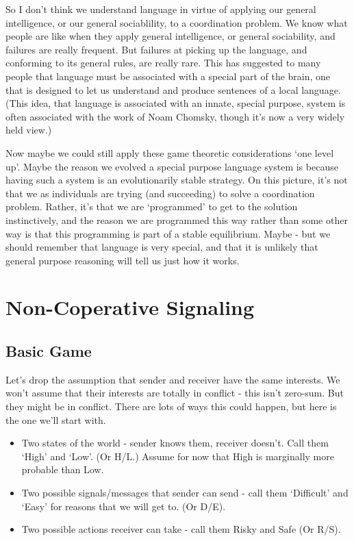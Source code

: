 \documentclass[
  11pt,
]{article}
\providecommand{\tightlist}{%
  \setlength{\itemsep}{0pt}\setlength{\parskip}{0pt}}
\begin{document}
So I don't think we understand language in virtue of applying our
general intelligence, or our general sociablility, to a coordination
problem. We know what people are like when they apply general
intelligence, or general sociability, and failures are really frequent.
But failures at picking up the language, and conforming to its general
rules, are really rare. This has suggested to many people that language
must be associated with a special part of the brain, one that is
designed to let us understand and produce sentences of a local language.
(This idea, that language is associated with an innate, special purpose,
system is often associated with the work of Noam Chomsky, though it's
now a very widely held view.)

Now maybe we could still apply these game theoretic considerations `one
level up'. Maybe the reason we evolved a special purpose language system
is because having such a system is an evolutionarily stable strategy. On
this picture, it's not that we as individuals are trying (and
succeeding) to solve a coordination problem. Rather, it's that we are
`programmed' to get to the solution instinctively, and the reason we are
programmed this way rather than some other way is that this programming
is part of a stable equilibrium. Maybe - but we should remember that
language is very special, and that it is unlikely that general purpose
reasoning will tell us just how it works.

\hypertarget{non-coperative-signaling}{%
\section{Non-Coperative Signaling}\label{non-coperative-signaling}}

\hypertarget{basic-game}{%
\subsection{Basic Game}\label{basic-game}}

Let's drop the assumption that sender and receiver have the same
interests. We won't assume that their interests are totally in conflict
- this isn't zero-sum. But they might be in conflict. There are lots of
ways this could happen, but here is the one we'll start with.

\begin{itemize}
\tightlist
\item
  Two states of the world - sender knows them, receiver doesn't. Call
  them `High' and `Low'. (Or H/L.) Assume for now that High is
  marginally more probable than Low.
\item
  Two possible signals/messages that sender can send - call them
  `Difficult' and `Easy' for reasons that we will get to. (Or D/E).
\item
  Two possible actions receiver can take - call them Risky and Safe (Or
  R/S).
\end{itemize}
\end{document}
